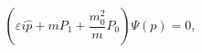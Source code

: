 \begin{equation}
\left( \varepsilon i\widehat{p} + m P_1+\frac{m_0^2}{m}P_0\right)
\Psi (p)=0 ,\label{76}
\end{equation}

